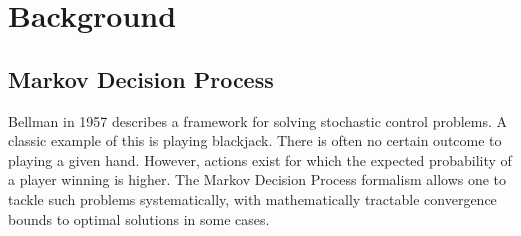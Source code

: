 



\chapter{Background}\label{chap:background}
\section{Markov Decision Process}

Bellman\cite{bellamn1957mdp} in 1957 describes a framework for solving stochastic control problems. A classic example of this is playing blackjack. There is often no certain outcome to playing a given hand. However, actions exist for which the expected probability of a player winning is higher. The Markov Decision Process formalism allows one to tackle such problems systematically, with mathematically tractable convergence bounds to optimal solutions in some cases.

